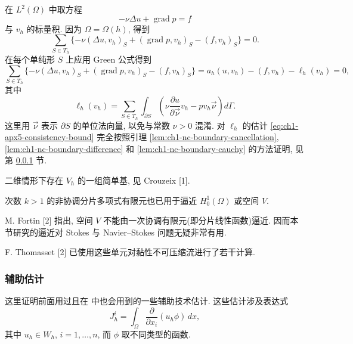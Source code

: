 \begin{Proof}
在 $L^2(\Omega)$ 中取方程
\begin{equation}
-\nu\Delta u+\operatorname{grad}p=f
\label{eq:ch1-apx5-strong-momentum}
\end{equation}
与 $v_h$ 的标量积. 因为 $\Omega=\Omega(h)$, 得到
\begin{equation}
\sum_{S\in T_h}\{-\nu(\Delta u,v_h)_S
+(\operatorname{grad}p,v_h)_S-(f,v_h)_S\}=0.
\label{eq:ch1-apx5-elementwise-momentum}
\end{equation}
在每个单纯形 $S$ 上应用 Green 公式得到
\[
\sum_{S\in T_h}\{-\nu(\Delta u,v_h)_S
+(\operatorname{grad}p,v_h)_S-(f,v_h)_S\}
=a_h(u,v_h)-(f,v_h)-\ell_h(v_h)=0,
\]
其中
\[
\ell_h(v_h)=\sum_{S\in T_h}\int_{\partial S}
\left(\nu\frac{\partial u}{\partial\vec\nu}v_h
-pv_h\vec\nu\right)d\Gamma.
\]
这里用 $\vec\nu$ 表示 $\partial S$ 的单位法向量, 以免与常数 $\nu>0$ 混淆. 对 $\ell_h$ 的估计 \eqref{eq:ch1-apx5-consistency-bound} 完全按照引理 \ref{lem:ch1-nc-boundary-cancellation}, \ref{lem:ch1-nc-boundary-difference} 和 \ref{lem:ch1-nc-boundary-cauchy} 的方法证明, 见第 \ref{subsubsec:ch1-nc-auxiliary-estimates} 节.
\end{Proof}

\begin{Remark}
\label{rem:ch1-apx5-basis-and-uses}
二维情形下存在 $V_h$ 的一组简单基, 见 Crouzeix [1].

次数 $k>1$ 的非协调分片多项式有限元也已用于逼近 $H_0^1(\Omega)$ 或空间 $V$.

M. Fortin [2] 指出, 空间 $V$ 不能由一次协调有限元(即分片线性函数)逼近. 因而本节研究的逼近对 Stokes 与 Navier--Stokes 问题无疑非常有用.

F. Thomasset [2] 已使用这些单元对黏性不可压缩流进行了若干计算.
\end{Remark}

\subsubsection{辅助估计}
\label{subsubsec:ch1-nc-auxiliary-estimates}

这里证明前面用过且在  中也会用到的一些辅助技术估计. 这些估计涉及表达式
\begin{equation}
J_h^i=\int_\Omega\frac{\partial}{\partial x_i}(u_h\phi)\,dx,
\label{eq:ch1-nc-auxiliary-jh}
\end{equation}
其中 $u_h\in W_h$, $i=1,\ldots,n$, 而 $\phi$ 取不同类型的函数.

